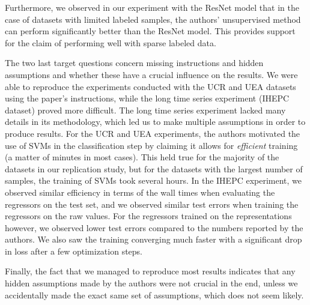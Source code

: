 Furthermore, we observed in our experiment with the ResNet model that in the case of datasets with limited labeled samples, the authors' unsupervised method can perform significantly better than the ResNet model. This provides support for the claim of performing well with sparse labeled data.

The two last target questions concern missing instructions and hidden assumptions and whether these have a crucial influence on the results. 
 We were able to reproduce the experiments conducted with the UCR and UEA datasets using the paper's instructions, while the long time series experiment (IHEPC dataset) proved more difficult. The long time series experiment lacked many details in its methodology, which led us to make multiple assumptions in order to produce results. For the UCR and UEA experiments, the authors motivated the use of SVMs in the classification step by claiming it allows for \textit{efficient} training (a matter of minutes in most cases). This held true for the majority of the datasets in our replication study, but for the datasets with the largest number of samples, the training of SVMs took several hours. In the IHEPC experiment, we observed similar efficiency in terms of the wall times when evaluating the regressors on the test set, and we observed similar test errors when training the regressors on the raw values. For the regressors trained on the representations however, we observed lower test errors compared to the numbers reported by the authors. We also saw the training converging much faster with a significant drop in loss after a few optimization steps.
 

Finally, the fact that we managed to reproduce most results indicates that any hidden assumptions made by the authors were not crucial in the end, unless we accidentally made the exact same set of assumptions, which does not seem likely.



